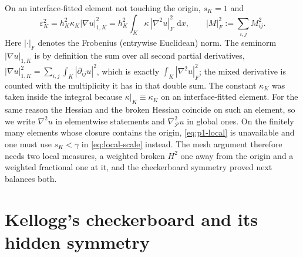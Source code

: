 \documentclass[10pt,pdftex]{amsart}%
\numberwithin{equation}{section}
\newcommand{\dd}{\,\mathrm{d}}
\newcommand{\Pcal}{\mathcal{P}}
\newcommand{\gradb}{\nabla_{\Pcal}}
\begin{document}
On an interface-fitted element not touching the origin, $s_K=1$ and
\begin{equation}\label{eq:p1-local}
  \varepsilon_K^2
  =h_K^2\kappa_K|\nabla u|_{1,K}^2
  =h_K^2\int_K\kappa\,|\nabla^2u|_F^2\,\dd x,
  \qquad
  |M|_F^2:=\sum_{i,j}M_{ij}^2 .
\end{equation}
Here $|\cdot|_F$ denotes the Frobenius (entrywise Euclidean) norm.  The seminorm $|\nabla u|_{1,K}$ is by definition the sum over all second partial derivatives, $|\nabla u|_{1,K}^2=\sum_{i,j}\int_K|\partial_{ij}u|^2$, which is exactly $\int_K|\nabla^2u|_F^2$; the mixed derivative is counted with the multiplicity it has in that double sum.  The constant $\kappa_K$ was taken inside the integral because $\kappa|_K\equiv\kappa_K$ on an interface-fitted element.  For the same reason the Hessian and the broken Hessian coincide on such an element, so we write $\nabla^2u$ in elementwise statements and $\gradb^2u$ in global ones.  On the finitely many elements whose closure contains the origin, \eqref{eq:p1-local} is unavailable and one must use $s_K<\gamma$ in \eqref{eq:local-scale} instead.  The mesh argument therefore needs two local measures, a weighted broken $H^2$ one away from the origin and a weighted fractional one at it, and the checkerboard symmetry proved next balances both.

\section{Kellogg's checkerboard and its hidden symmetry}
\label{sec:symmetry}
\end{document}
